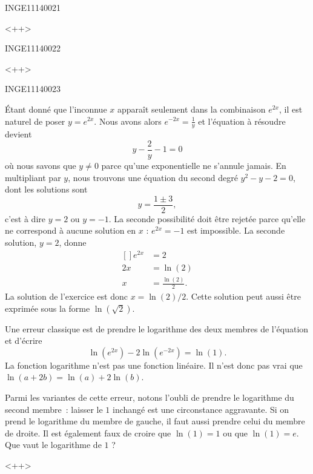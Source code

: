 \documentclass{article}
\begin{document}
\begin{corrige}{INGE11140021}

<++>

\end{corrige}%


\begin{corrige}{INGE11140022}

<++>

\end{corrige}%


\begin{corrige}{INGE11140023}

	Étant donné que l'inconnue $x$ apparaît seulement dans la combinaison $e^{2x}$, il est naturel de poser $y= e^{2x}$. Nous avons alors $ e^{-2x}=\frac{1}{ y }$ et l'équation à résoudre devient
	\begin{equation}
		y-\frac{ 2 }{ y }-1=0
	\end{equation}
	où nous savons que $y\neq 0$ parce qu'une exponentielle ne s'annule jamais. En multipliant par $y$, nous trouvons une équation du second degré $y^2-y-2=0$, dont les solutions sont
	\begin{equation}
		y=\frac{ 1\pm 3 }{2},
	\end{equation}
	c'est à dire $y=2$ ou $y=-1$. La seconde possibilité doit être rejetée parce qu'elle ne correspond à aucune solution en $x$ : $ e^{2x}=-1$ est impossible. La seconde solution, $y=2$, donne
	\begin{equation}
		\begin{aligned}[]
			e^{2x}&=2\\
			2x&=\ln(2)\\
			x&=\frac{ \ln(2) }{ 2 }.
		\end{aligned}
	\end{equation}
	La solution de l'exercice est donc $x=\ln(2)/2$. Cette solution peut aussi être exprimée sous la forme $\ln(\sqrt{2})$.

	\begin{remark}
		Une erreur classique est de prendre le logarithme des deux membres de l'équation et d'écrire
		\begin{equation}
			\ln( e^{2x})-2\ln( e^{-2x})=\ln(1).
		\end{equation}
		La fonction logarithme n'est pas une fonction linéaire. Il n'est donc pas vrai que $\ln(a+2b)=\ln(a)+2\ln(b)$.

		Parmi les variantes de cette erreur, notons l'oubli de prendre le logarithme du second membre~: laisser le $1$ inchangé est une circonstance aggravante. Si on prend le logarithme du membre de gauche, il faut aussi prendre celui du membre de droite. Il est également faux de croire que $\ln(1)=1$ ou que $\ln(1)=e$. Que vaut le logarithme de $1$ ?
	\end{remark}
	<++>

\end{corrige}
\end{document}
